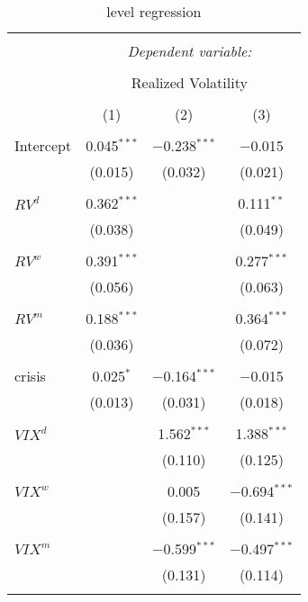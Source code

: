 
\begin{table}[!htbp] \centering 
  \caption{level regression} 
  \label{} 
\begin{tabular}{@{\extracolsep{5pt}}lccc} 
\\[-1.8ex]\hline 
\hline \\[-1.8ex] 
 & \multicolumn{3}{c}{\textit{Dependent variable:}} \\ 
\cline{2-4} 
\\[-1.8ex] & \multicolumn{3}{c}{Realized Volatility} \\ 
\\[-1.8ex] & (1) & (2) & (3)\\ 
\hline \\[-1.8ex] 
 Intercept & 0.045$^{***}$ & $-$0.238$^{***}$ & $-$0.015 \\ 
  & (0.015) & (0.032) & (0.021) \\ 
  & & & \\ 
 $RV^{d}$ & 0.362$^{***}$ &  & 0.111$^{**}$ \\ 
  & (0.038) &  & (0.049) \\ 
  & & & \\ 
 $RV^{w}$ & 0.391$^{***}$ &  & 0.277$^{***}$ \\ 
  & (0.056) &  & (0.063) \\ 
  & & & \\ 
 $RV^{m}$ & 0.188$^{***}$ &  & 0.364$^{***}$ \\ 
  & (0.036) &  & (0.072) \\ 
  & & & \\ 
 crisis & 0.025$^{*}$ & $-$0.164$^{***}$ & $-$0.015 \\ 
  & (0.013) & (0.031) & (0.018) \\ 
  & & & \\ 
 $VIX^{d}$ &  & 1.562$^{***}$ & 1.388$^{***}$ \\ 
  &  & (0.110) & (0.125) \\ 
  & & & \\ 
 $VIX^{w}$ &  & 0.005 & $-$0.694$^{***}$ \\ 
  &  & (0.157) & (0.141) \\ 
  & & & \\ 
 $VIX^{m}$ &  & $-$0.599$^{***}$ & $-$0.497$^{***}$ \\ 
  &  & (0.131) & (0.114) \\ 
  & & & \\ 

\end{tabular}
\end{table}
